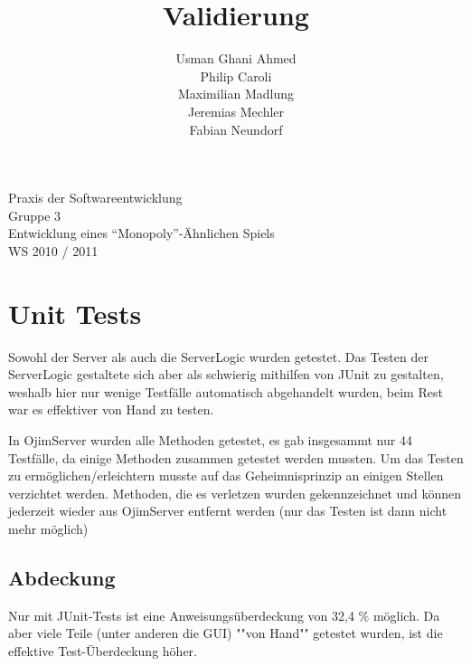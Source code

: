 \documentclass[a4paper,10pt]{article}
\title{Validierung}
\date{}
\author{Usman Ghani Ahmed \\
Philip Caroli\\
Maximilian Madlung\\ 
Jeremias Mechler\\ 
Fabian Neundorf}
\begin{document}
 
\vspace{5cm}
\maketitle
\begin{center}
\vspace{3cm}
\huge{Praxis der Softwareentwicklung \\
Gruppe 3 \\[0.5cm]
Entwicklung eines "`Monopoly"'-Ähnlichen Spiels \\[0.5cm]
WS 2010 / 2011} \\[2cm]
\end{center}

\newpage

\tableofcontents

\newpage

\section{Unit Tests}

Sowohl der Server als auch die ServerLogic wurden getestet. Das Testen der ServerLogic gestaltete sich aber als schwierig mithilfen von JUnit zu gestalten, weshalb hier nur wenige Testfälle automatisch abgehandelt wurden, beim Rest war es effektiver von Hand zu testen.

In OjimServer wurden alle Methoden getestet, es gab insgesammt nur 44 Testfälle, da einige Methoden zusammen getestet werden mussten. Um das Testen zu ermöglichen/erleichtern musste auf das Geheimnisprinzip an einigen Stellen verzichtet werden. Methoden, die es verletzen wurden gekennzeichnet und können jederzeit wieder aus OjimServer entfernt werden (nur das Testen ist dann nicht mehr möglich)

\subsection{Abdeckung}
Nur mit JUnit-Tests ist eine Anweisungsüberdeckung von 32,4 \% möglich.
Da aber viele Teile (unter anderen die GUI) ""von Hand"" getestet wurden, ist die effektive Test-Überdeckung höher.
\end{document}
